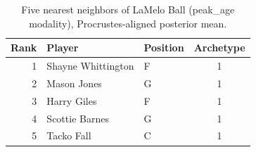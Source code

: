 \begin{table}[htbp]
  \centering\small
  \begin{tabular}{rllc}
    \toprule
    Rank & Player & Position & Archetype \\
    \midrule
    1 & Shayne Whittington & F & 1 \\
    2 & Mason Jones & G & 1 \\
    3 & Harry Giles & F & 1 \\
    4 & Scottie Barnes & G & 1 \\
    5 & Tacko Fall & C & 1 \\
    \bottomrule
  \end{tabular}
  \caption{Five nearest neighbors of LaMelo Ball (peak_age modality), Procrustes-aligned posterior mean.}
  \label{tab:LaMelo_Ball_neighbors_peak_age}
\end{table}

